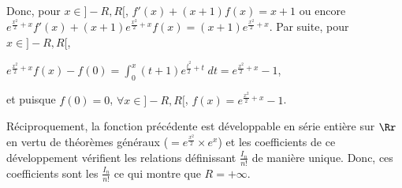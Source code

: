 {{Donc, pour $x\in]-R,R[$, $f'(x)+(x+1)f(x)=x+1$ ou encore $e^{\frac{x^2}{2}+x}f'(x)+(x+1)e^{\frac{x^2}{2}+x}f(x)=(x+1)e^{\frac{x^2}{2}+x}$. Par suite, pour $x\in]-R,R[$,

\begin{center}
$e^{\frac{x^2}{2}+x}f(x)-f(0)=\int_{0}^{x}(t+1)e^{\frac{t^2}{2}+t}\;dt=e^{\frac{x^2}{2}+x}-1$,
\end{center}

et puisque $f(0)=0$, $\forall x\in]-R,R[$, $f(x)=e^{\frac{x^2}{2}+x}-1$.

Réciproquement, la fonction précédente est développable en série entière sur $\Rr$ en vertu de théorèmes généraux ($=e^{\frac{x^2}{2}}\times e^x$) et les coefficients de ce développement vérifient les relations définissant $\frac{I_n}{n!}$ de manière unique. Donc, ces coefficients sont les $\frac{I_n}{n!}$ ce qui montre que $R = +\infty$.

\begin{center}
\end{center}
}
}
